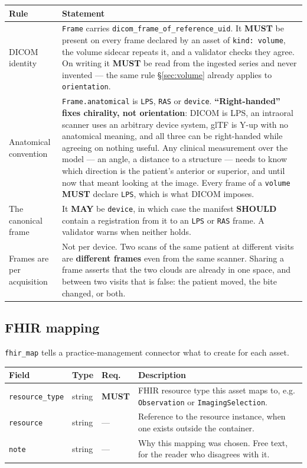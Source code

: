 \documentclass[11pt,a4paper]{article}
\newcommand{\MUST}{\textcolor{uosred}{\textbf{MUST}}}
\newcommand{\SHOULD}{\textcolor{uosamber}{\textbf{SHOULD}}}
\newcommand{\MAY}{\textcolor{uosgreen}{\textbf{MAY}}}
\newcommand{\code}[1]{\texttt{\small #1}}
\begin{document}
\begin{longtable}{L{3.6cm} L{11.8cm}}
\toprule
\textbf{Rule} & \textbf{Statement}\\
\midrule
\endhead
DICOM identity & \code{Frame} carries \code{dicom\_frame\_of\_reference\_uid}. It \MUST{}
be present on every frame declared by an asset of \code{kind: volume}, the volume sidecar
repeats it, and a validator checks they agree. On writing it \MUST{} be read from the
ingested series and never invented --- the same rule \S\ref{sec:volume} already applies to
\code{orientation}.\\
Anatomical convention & \code{Frame.anatomical} is \code{LPS}, \code{RAS} or
\code{device}. \textbf{``Right-handed'' fixes chirality, not orientation}: DICOM is LPS, an
intraoral scanner uses an arbitrary device system, glTF is Y-up with no anatomical meaning,
and all three can be right-handed while agreeing on nothing useful. Any clinical
measurement over the model --- an angle, a distance to a structure --- needs to know which
direction is the patient's anterior or superior, and until now that meant looking at the
image. Every frame of a \code{volume} \MUST{} declare \code{LPS}, which is what DICOM
imposes.\\
The canonical frame & It \MAY{} be \code{device}, in which case the manifest \SHOULD{}
contain a registration from it to an \code{LPS} or \code{RAS} frame. A validator warns
when neither holds.\\
Frames are per acquisition & Not per device. Two scans of the same patient at different
visits are \textbf{different frames} even from the same scanner. Sharing a frame asserts
that the two clouds are already in one space, and between two visits that is false: the
patient moved, the bite changed, or both.\\
\bottomrule
\end{longtable}

\subsection{FHIR mapping}\label{sec:fhir}

\code{fhir\_map} tells a practice-management connector what to create for each asset.

\begin{longtable}{L{3.5cm} L{3.0cm} C{1.4cm} L{6.4cm}}
\toprule
\textbf{Field} & \textbf{Type} & \textbf{Req.} & \textbf{Description}\\
\midrule
\endhead
\code{resource\_type} & string & \MUST{} & FHIR resource type this asset maps to, e.g. \code{Observation} or \code{ImagingSelection}.\\
\code{resource} & string & --- & Reference to the resource instance, when one exists outside the container.\\
\code{note} & string & --- & Why this mapping was chosen. Free text, for the reader who disagrees with it.\\
\bottomrule
\end{longtable}
\end{document}
